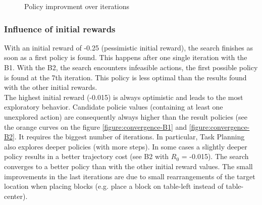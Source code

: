 \documentclass[conference]{IEEEtran}
\begin{document}
\begin{figure}[h!]
  \caption{Policy improvment over iterations}
\end{figure}

\subsubsection{Influence of initial rewards} With an initial reward of -0.25 (pessimistic initial reward), the search finishes as soon as a first policy is found. This happens after one single iteration with the B1. With the B2, the search encounters infeasible actions, the first possible policy is found at the 7th iteration. This policy is less optimal than the results found with the other initial rewards.\\The highest initial reward (-0.015) is always optimistic and leads to the most exploratory behavior. Candidate policie values (containing at least one unexplored action) are consequently always higher than the result policies (see the orange curves on the figure \ref{figure:convergence-B1} and \ref{figure:convergence-B2}. It requires the biggest number of iterations. In particular, Task Planning also explores deeper policies (with more steps). In some cases a slightly deeper policy results in a better trajectory cost (see B2 with $R_0$ = -0.015). The search converges to a better policy than with the other initial reward values. The small improvements in the last iterations are due to small rearrangements of the target location when placing blocks (e.g. place a block on table-left instead of table-center). \\
\end{document}
